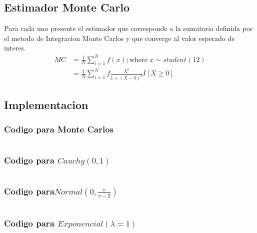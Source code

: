\documentclass{article}
\begin{document}
\subsection{Estimador Monte Carlo}
Para cada uno presente el estimador que corresponde a la sumatoria definida por el metodo de Integracion
Monte Carlos y que converge al valor esperado de interes.
\[
	\begin{split}
		MC & = \frac{1}{N}\sum_{i=1}^{N}f(x) ; \text{where } x \sim student(12) \\
		   & = \frac{1}{N}\sum_{i=1}^{N}f\frac{X^5}{1+(X - 3)^2}I[X \ge 0]
	\end{split}
\]


\subsection{Implementacion}

\subsubsection{Codigo para Monte Carlos}
\begin{pythonbox}
	\inputminted{python}{code/mc.py}
\end{pythonbox}

\subsubsection{Codigo para $Cauchy(0,1)$}
\begin{pythonbox}
	\inputminted{python}{code/cauchy.py}
\end{pythonbox}

\subsubsection{Codigo para$Normal(0, \frac{v}{v-2})$}
\begin{pythonbox}
	\inputminted{python}{code/normal.py}
\end{pythonbox}

\subsubsection{Codigo para $Exponencial(\lambda=1)$}
\begin{pythonbox}
	\inputminted{python}{code/exp.py}
\end{pythonbox}
\end{document}
